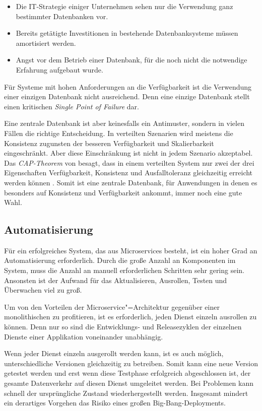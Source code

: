 \begin{itemize}
  \item Die IT-Strategie einiger Unternehmen sehen nur die Verwendung ganz bestimmter Datenbanken vor.
	\item Bereits getätigte Investitionen in bestehende Datenbanksysteme müssen amortisiert werden.
	\item Angst vor dem Betrieb einer Datenbank, für die noch nicht die notwendige Erfahrung aufgebaut wurde.
\end{itemize}

Für Systeme mit hohen Anforderungen an die Verfügbarkeit ist die Verwendung einer einzigen Datenbank nicht ausreichend. Denn eine einzige Datenbank stellt einen kritischen \textit{Single Point of Failure} dar.

Eine zentrale Datenbank ist aber keinesfalls ein Antimuster, sondern in vielen Fällen die richtige Entscheidung. In verteilten Szenarien wird meistens die Konsistenz zugunsten der besseren Verfügbarkeit und Skalierbarkeit eingeschränkt. Aber diese Einschränkung ist nicht in jedem Szenario akzeptabel. Das \textit{CAP-Theorem} von \citeauthor{Brewer:2000:TRD:343477.343502} besagt, dass in einem verteilten System nur zwei der drei Eigenschaften Verfügbarkeit, Konsistenz und Ausfalltoleranz gleichzeitig erreicht werden können \cite{Brewer:2000:TRD:343477.343502}. Somit ist eine zentrale Datenbank, für Anwendungen in denen es besonders auf Konsistenz und Verfügbarkeit ankommt, immer noch eine gute Wahl.

\subsection{Automatisierung}

Für ein erfolgreiches System, das aus Microservices besteht, ist ein hoher Grad an Automatisierung erforderlich. Durch die große Anzahl an Komponenten im System, muss die Anzahl an manuell erforderlichen Schritten sehr gering sein. Ansonsten ist der Aufwand für das Aktualisieren, Ausrollen, Testen und Überwachen viel zu groß.

Um von den Vorteilen der Microservice"=Architektur gegenüber einer monolithischen zu profitieren, ist es erforderlich, jeden Dienst einzeln ausrollen zu können. Denn nur so sind die Entwicklungs- und Release\-zyklen der einzelnen Dienste einer Applikation voneinander unabhängig.

Wenn jeder Dienst einzeln ausgerollt werden kann, ist es auch möglich, unterschiedliche Versionen gleichzeitig zu betreiben. Somit kann eine neue Version getestet werden und erst wenn diese Testphase erfolgreich abgeschlossen ist, der gesamte Datenverkehr auf diesen Dienst umgeleitet werden. Bei Problemen kann schnell der ursprüngliche Zustand wiederhergestellt werden. Insgesamt mindert ein derartiges Vorgehen das Risiko eines großen Big-Bang-Deployments.

